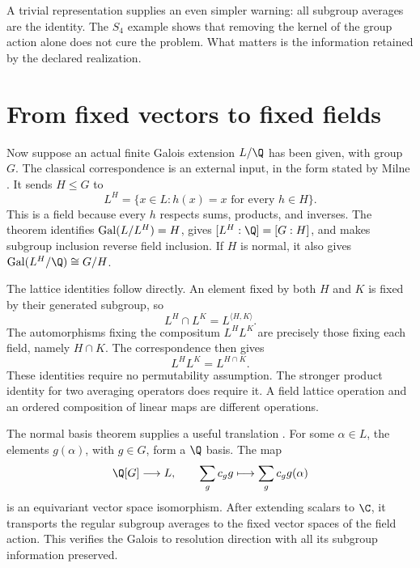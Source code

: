 A trivial representation supplies an even simpler warning: all subgroup averages are the identity. The \(S_4\) example shows that removing the kernel of the group action alone does not cure the problem. What matters is the information retained by the declared realization.

\section{From fixed vectors to fixed fields}

Now suppose an actual finite Galois extension \(L/\Q\) has been given, with group \(G\). The classical correspondence is an external input, in the form stated by Milne \cite[Theorem 3.17]{Milne2022}. It sends \(H\leq G\) to
\[
 L^H=\{x\in L:h(x)=x\text{ for every }h\in H\}.
\]
This is a field because every \(h\) respects sums, products, and inverses. The theorem identifies \(\operatorname{Gal}(L/L^H)=H\), gives \([L^H:\Q]=[G:H]\), and makes subgroup inclusion reverse field inclusion. If \(H\) is normal, it also gives \(\Gal(L^H/\Q)\cong G/H\).

The lattice identities follow directly. An element fixed by both \(H\) and \(K\) is fixed by their generated subgroup, so
\begin{equation}
 L^H\cap L^K=L^{\langle H,K\rangle}.
 \label{eq:b-field-intersection}
\end{equation}
The automorphisms fixing the compositum \(L^HL^K\) are precisely those fixing each field, namely \(H\cap K\). The correspondence then gives
\begin{equation}
 L^HL^K=L^{H\cap K}.
 \label{eq:b-field-compositum}
\end{equation}
These identities require no permutability assumption. The stronger product identity for two averaging operators does require it. A field lattice operation and an ordered composition of linear maps are different operations.

The normal basis theorem supplies a useful translation \cite[Theorem 5.18]{Milne2022}. For some \(\alpha\in L\), the elements \(g(\alpha)\), with \(g\in G\), form a \(\Q\) basis. The map
\begin{equation}
 \Q[G]\longrightarrow L,
 \qquad \sum_g c_g g\longmapsto\sum_g c_g g(\alpha)
 \label{eq:b-normal-basis-map}
\end{equation}
is an equivariant vector space isomorphism. After extending scalars to \(\C\), it transports the regular subgroup averages to the fixed vector spaces of the field action. This verifies the Galois to resolution direction with all its subgroup information preserved.

